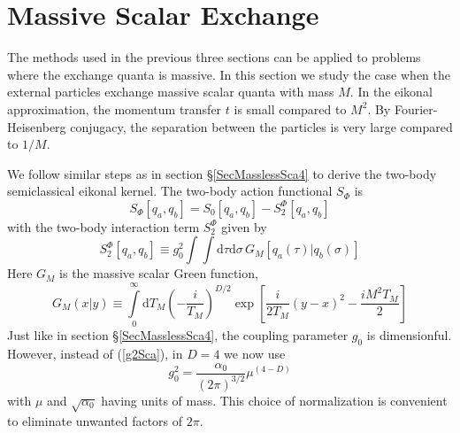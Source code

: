 \section{Massive Scalar Exchange\label{SecMassiveSca4}}
The methods used in the previous three sections can be applied to problems where the exchange quanta is massive. In this section we study the case when the external particles exchange massive scalar quanta with mass $M$. In the eikonal approximation, the momentum transfer $t$ is small compared to $M^{2}$. By Fourier-Heisenberg conjugacy, the separation between the particles is very large compared to $1/M$.

We follow similar steps as in section \S\ref{SecMasslessSca4} to derive the two-body semiclassical eikonal kernel. The two-body action functional $S_{\Phi}$ is
\begin{equation}
	S_{\Phi}[q_{a}, q_{b}] = S_{0}[q_{a}, q_{b}] - S_{2}^{\Phi}[q_{a}, q_{b}]
\end{equation}
with the two-body interaction term $S_{2}^{\Phi}$ given by
\begin{equation}
	S_{2}^{\Phi}\left[q_{a}, q_{b} \right] \equiv g^{2}_{0} \int \int \mathrm{d}\tau \mathrm{d}\sigma \, G_{M} \left[ q_{a}(\tau) | q_{b}(\sigma) \right] \label{S2ScaM}
\end{equation}
Here $G_{M}$ is the massive scalar Green function,
\begin{equation}
	G_{M}(x|y) \equiv \int\limits_{0}^{\infty} \mathrm{d} T_{M} \left( - \frac{i}{T_{M}} \right)^{D/2} \exp{\left[ \frac{i}{2 T_{M}} (y - x)^{2} - \frac{i M^{2} T_{M}}{2} \right]}
\end{equation}
Just like in section \S\ref{SecMasslessSca4}, the coupling parameter $g_{0}$ is dimensionful. However, instead of (\ref{g2Sca}), in $D = 4$ we now use
\begin{equation}
	g^{2}_{0} = \frac{\alpha_{0}}{(2 \pi)^{3/2}} \mu^{(4-D)}
\end{equation}
with $\mu$ and $\sqrt{\alpha_{0}}$ having units of mass. This choice of normalization is convenient to eliminate unwanted factors of $2\pi$.
